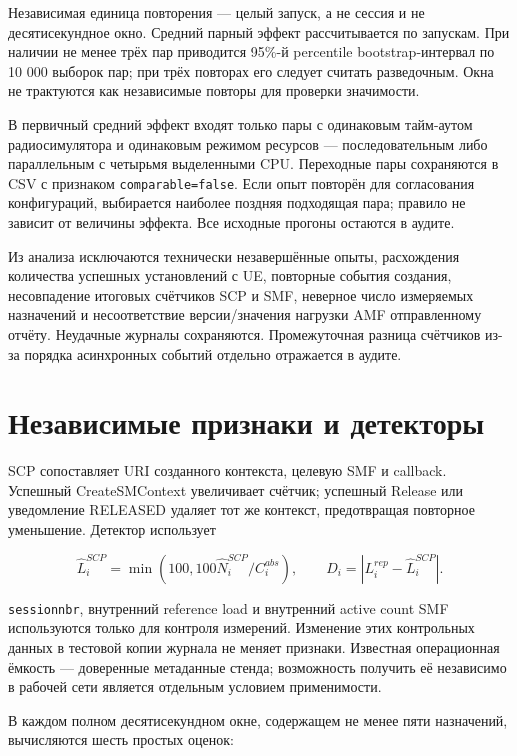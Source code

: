 \documentclass[11pt,a4paper]{article}
\begin{document}
Независимая единица повторения — целый запуск, а не сессия и не десятисекундное окно. Средний парный эффект рассчитывается по запускам. При наличии не менее трёх пар приводится 95\%-й percentile bootstrap-интервал по 10 000 выборок пар; при трёх повторах его следует считать разведочным. Окна не трактуются как независимые повторы для проверки значимости.

В первичный средний эффект входят только пары с одинаковым тайм-аутом радиосимулятора и одинаковым режимом ресурсов — последовательным либо параллельным с четырьмя выделенными CPU. Переходные пары сохраняются в CSV с признаком \texttt{comparable=false}. Если опыт повторён для согласования конфигураций, выбирается наиболее поздняя подходящая пара; правило не зависит от величины эффекта. Все исходные прогоны остаются в аудите.

Из анализа исключаются технически незавершённые опыты, расхождения количества успешных установлений с UE, повторные события создания, несовпадение итоговых счётчиков SCP и SMF, неверное число измеряемых назначений и несоответствие версии/значения нагрузки AMF отправленному отчёту. Неудачные журналы сохраняются. Промежуточная разница счётчиков из-за порядка асинхронных событий отдельно отражается в аудите.

\section*{Независимые признаки и детекторы}

SCP сопоставляет URI созданного контекста, целевую SMF и callback. Успешный CreateSMContext увеличивает счётчик; успешный Release или уведомление RELEASED удаляет тот же контекст, предотвращая повторное уменьшение. Детектор использует

\[
\widehat L_i^{SCP}=\min(100,100\widehat N_i^{SCP}/C_i^{abs}),\qquad
D_i=|L_i^{rep}-\widehat L_i^{SCP}|.
\]

\texttt{sessionnbr}, внутренний reference load и внутренний active count SMF используются только для контроля измерений. Изменение этих контрольных данных в тестовой копии журнала не меняет признаки. Известная операционная ёмкость — доверенные метаданные стенда; возможность получить её независимо в рабочей сети является отдельным условием применимости.

В каждом полном десятисекундном окне, содержащем не менее пяти назначений, вычисляются шесть простых оценок:
\end{document}
